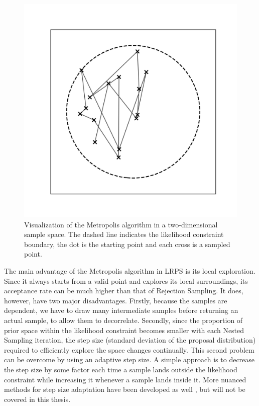 \documentclass[12pt, a4paper]{report}
\begin{document}
\begin{figure}
    \centering
    \includegraphics[scale=0.5]{figs/metropolis_example.png}
    \caption{Visualization of the Metropolis algorithm in a two-dimensional sample space. The dashed line indicates the likelihood constraint boundary, the dot is the starting point and each cross is a sampled point.}
    \label{fig:metropolis_example}
\end{figure}

The main advantage of the Metropolis algorithm in LRPS is its local exploration.
Since it always starts from a valid point and explores its local surroundings, its acceptance rate can be much higher than that of Rejection Sampling.
It does, however, have two major disadvantages.
Firstly, because the samples are dependent, we have to draw many intermediate samples before returning an actual sample, to allow them to decorrelate.
Secondly, since the proportion of prior space within the likelihood constraint becomes smaller with each Nested Sampling iteration, the step size (standard deviation of the proposal distribution) required to efficiently explore the space changes continually.
This second problem can be overcome by using an adaptive step size.
A simple approach is to decrease the step size by some factor each time a sample lands outside the likelihood constraint while increasing it whenever a sample lands inside it.
More nuanced methods for step size adaptation have been developed as well \cite{automala}, but will not be covered in this thesis.
\end{document}
